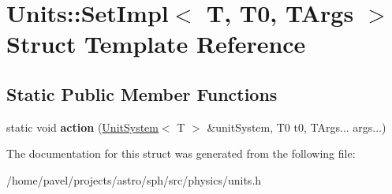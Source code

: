 \hypertarget{structUnits_1_1SetImpl}{}\section{Units\+:\+:Set\+Impl$<$ T, T0, T\+Args $>$ Struct Template Reference}
\label{structUnits_1_1SetImpl}
\subsection*{Static Public Member Functions}
\begin{DoxyCompactItemize}
\item 
\hypertarget{structUnits_1_1SetImpl_a299a774dce501f31bd6483f027135e72}{}\label{structUnits_1_1SetImpl_a299a774dce501f31bd6483f027135e72} 
static void {\bfseries action} (\hyperlink{classUnitSystem}{Unit\+System}$<$ T $>$ \&unit\+System, T0 t0, T\+Args... args...)
\end{DoxyCompactItemize}


The documentation for this struct was generated from the following file\+:\begin{DoxyCompactItemize}
\item 
/home/pavel/projects/astro/sph/src/physics/units.\+h\end{DoxyCompactItemize}
